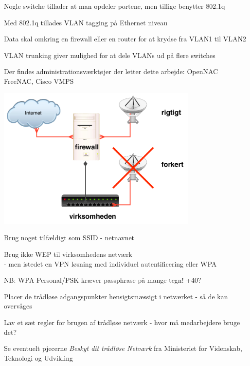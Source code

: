\documentclass[20pt,landscape,a4paper,footrule]{foils}
\begin{document}


\begin{list2}
\item Nogle switche tillader at man opdeler portene, men tillige benytter 802.1q
\item Med 802.1q tillades VLAN tagging på Ethernet niveau
\item Data skal omkring en firewall eller en router for at krydse fra VLAN1 til VLAN2
\item VLAN trunking giver mulighed for at dele VLANs ud på flere switches
\item Der findes administrationsværktøjer der letter dette arbejde: OpenNAC FreeNAC, Cisco VMPS
\end{list2}




\begin{minipage}{10cm}
\includegraphics[width=10cm]{images/wlan-accesspoint-2.pdf}
\end{minipage}
\begin{minipage}{\linewidth-10cm}
\begin{list2}
\item Brug noget tilfældigt som SSID - netnavnet
\item Brug ikke WEP til virksomhedens netværk\\
- men istedet en VPN løsning med individuel
  autentificering eller WPA
\item NB: WPA Personal/PSK kræver passphrase på mange tegn! +40?
\item Placer de trådløse adgangspunkter hensigtsmæssigt i netværket -
  så de kan overvåges
\item Lav et sæt regler for brugen af trådløse netværk - hvor må
  medarbejdere bruge det?
\item Se eventuelt pjecerne \emph{Beskyt dit trådløse Netværk} fra
Ministeriet for Videnskab, Teknologi og Udvikling \\
\end{list2}
\end{minipage}
\end{document}
